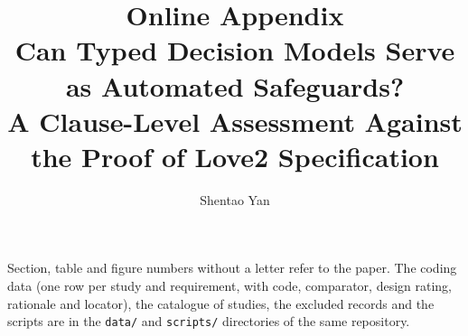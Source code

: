 \documentclass[11pt]{article}
\title{\sffamily\bfseries Online Appendix\\[4pt]\large Can Typed Decision Models Serve as Automated Safeguards?\\ A Clause-Level Assessment Against the Proof of Love2 Specification}
\author{Shentao Yan}
\date{}
\begin{document}
\maketitle
\noindent Section, table and figure numbers without a letter refer to the paper. The coding data (one row per study and requirement, with code, comparator, design rating, rationale and locator), the catalogue of studies, the excluded records and the scripts are in the \nolinkurl{data/} and \nolinkurl{scripts/} directories of the same repository.









\end{document}
